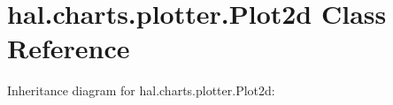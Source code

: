 \hypertarget{classhal_1_1charts_1_1plotter_1_1_plot2d}{}\section{hal.\+charts.\+plotter.\+Plot2d Class Reference}
\label{classhal_1_1charts_1_1plotter_1_1_plot2d}


Inheritance diagram for hal.\+charts.\+plotter.\+Plot2d\+:
